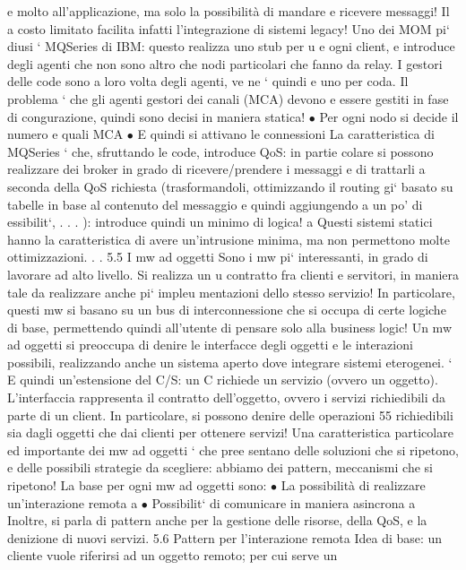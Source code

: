 \documentclass[a4paper,12pt]{article}
\begin{document}
e
molto all'applicazione, ma solo la possibilità di mandare e ricevere messaggi! Il
a
costo limitato facilita infatti l'integrazione di sistemi legacy!
Uno dei MOM pi` diusi ` MQSeries di IBM: questo realizza uno stub per
u
e
ogni client, e introduce degli agenti che non sono altro che nodi particolari che
fanno da relay. I gestori delle code sono a loro volta degli agenti, ve ne ` quindi
e
uno per coda. Il problema ` che gli agenti gestori dei canali (MCA) devono
e
essere gestiti in fase di congurazione, quindi sono decisi in maniera statica!
$\bullet$ Per ogni nodo si decide il numero e quali MCA
$\bullet$ E quindi si attivano le connessioni
La caratteristica di MQSeries ` che, sfruttando le code, introduce QoS: in partie
colare si possono realizzare dei broker in grado di ricevere/prendere i messaggi e
di trattarli a seconda della QoS richiesta (trasformandoli, ottimizzando il routing gi` basato su tabelle in base al
contenuto del messaggio e quindi aggiungendo
a
un po' di essibilit`, . . . ): introduce quindi un minimo di logica!
a
Questi sistemi statici hanno la caratteristica di avere un'intrusione minima,
ma non permettono molte ottimizzazioni. . .
5.5
I mw ad oggetti
Sono i mw pi` interessanti, in grado di lavorare ad alto livello. Si realizza un
u
contratto fra clienti e servitori, in maniera tale da realizzare anche pi` impleu
mentazioni dello stesso servizio! In particolare, questi mw si basano su un bus
di interconnessione che si occupa di certe logiche di base, permettendo quindi
all'utente di pensare solo alla business logic! Un mw ad oggetti si preoccupa di
denire le interfacce degli oggetti e le interazioni possibili, realizzando anche un
sistema aperto dove integrare sistemi eterogenei.
`
E quindi un'estensione del C/S: un C richiede un servizio (ovvero un oggetto). L'interfaccia rappresenta il contratto
dell'oggetto, ovvero i servizi richiedibili da parte di un client. In particolare, si possono denire delle operazioni
55
\newpage
richiedibili sia dagli oggetti che dai clienti per ottenere servizi!
Una caratteristica particolare ed importante dei mw ad oggetti ` che pree
sentano delle soluzioni che si ripetono, e delle possibili strategie da scegliere:
abbiamo dei pattern, meccanismi che si ripetono!
La base per ogni mw ad oggetti sono:
$\bullet$ La possibilità di realizzare un'interazione remota
a
$\bullet$ Possibilit` di comunicare in maniera asincrona
a
Inoltre, si parla di pattern anche per la gestione delle risorse, della QoS, e la
denizione di nuovi servizi.
5.6
Pattern per l'interazione remota
Idea di base: un cliente vuole riferirsi ad un oggetto remoto; per cui serve un
\end{document}
